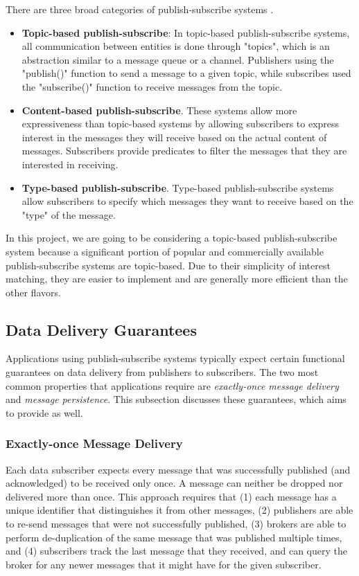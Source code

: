 There are three broad categories of publish-subscribe systems \cite{eugster2003many}. 
\begin{itemize}
\item \textbf{Topic-based publish-subscribe}: In topic-based publish-subscribe systems, all communication between entities is done through "topics", which is an abstraction similar to a message queue or a channel. Publishers using the "publish()" function to send a message to a given topic, while subscribes used the "subscribe()" function to receive messages from the topic.
\item \textbf{Content-based publish-subscribe}. These systems allow more expressiveness than topic-based systems by allowing subscribers to express interest in the messages they will receive based on the actual content of messages. Subscribers provide predicates to filter the messages that they are interested in receiving.
\item \textbf{Type-based publish-subscribe}. Type-based publish-subscribe systems allow subscribers to specify which messages they want to receive based on the "type" of the message. 
\end{itemize}
In this project, we are going to be considering a topic-based publish-subscribe system because a significant portion of popular and commercially available publish-subscribe systems are topic-based. Due to their simplicity of interest matching, they are easier to implement and are generally more efficient than the other flavors. 

\subsection{Data Delivery Guarantees}
Applications using publish-subscribe systems typically expect certain functional guarantees on data delivery from publishers to subscribers. The two most common properties that applications require are \textit{exactly-once message delivery} and \textit{message persistence}. This subsection discusses these guarantees, which \epulsar{} aims to provide as well.
\subsubsection{Exactly-once Message Delivery}
Each data subscriber expects every message that was successfully published (and acknowledged) to be received only once. A message can neither be dropped nor delivered more than once. This approach requires that (1) each message has a unique identifier that distinguishes it from other messages, (2) publishers are able to re-send messages that were not successfully published, (3) brokers are able to perform de-duplication of the same message that was published multiple times, and (4) subscribers track the last message that they received, and can query the broker for any newer messages that it might have for the given subscriber. 

